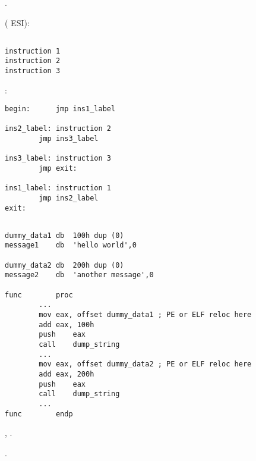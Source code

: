  .

 (
 ESI):



\subsection{}

\begin{lstlisting}
instruction 1
instruction 2
instruction 3
\end{lstlisting}

:

\begin{lstlisting}
begin:		jmp	ins1_label

ins2_label:	instruction 2
		jmp	ins3_label

ins3_label:	instruction 3
		jmp	exit:

ins1_label:	instruction 1
		jmp	ins2_label
exit:
\end{lstlisting}

\subsection{}

\begin{lstlisting}
dummy_data1	db	100h dup (0)
message1	db	'hello world',0

dummy_data2	db	200h dup (0)
message2	db	'another message',0

func		proc
		...
		mov	eax, offset dummy_data1 ; PE or ELF reloc here
		add	eax, 100h
		push	eax
		call	dump_string
		...
		mov	eax, offset dummy_data2 ; PE or ELF reloc here
		add	eax, 200h
		push	eax
		call	dump_string
		...
func		endp
\end{lstlisting}

\IDA{}   \AndENRU {}, 
.

.

